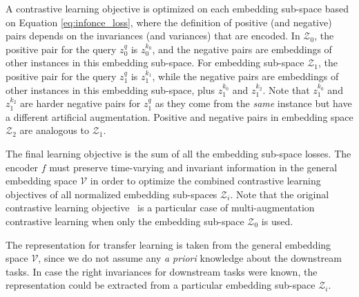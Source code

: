 \documentclass[10pt,twocolumn,letterpaper]{article}
\begin{document}
A contrastive learning objective is optimized on each embedding sub-space based on Equation \ref{eq:infonce_loss}, where the definition of positive (and negative) pairs depends on the invariances (and variances) that are encoded. In $\mathcal{Z}_0$, the positive pair for the query $z_0^q$ is $z_0^{k_0}$, and the negative pairs are embeddings of other instances in this embedding sub-space. For embedding sub-space $\mathcal{Z}_1$, the positive pair for the query $z_1^q$ is $z_1^{k_1}$, while the negative pairs are embeddings of other instances in this embedding sub-space, plus $z_1^{k_0}$ and $z_1^{k_2}$. Note that $z_1^{k_0}$ and $z_1^{k_2}$ are harder negative pairs for $z_1^q$ as they come from the \textit{same} instance but have a different artificial augmentation. Positive and negative pairs in embedding space $\mathcal{Z}_2$ are analogous to $\mathcal{Z}_1$. 

The final learning objective is the sum of all the embedding sub-space losses. The encoder $f$ must preserve time-varying and invariant information in the general embedding space $\mathcal{V}$ in order to optimize the combined contrastive learning objectives of all normalized embedding sub-spaces $\mathcal{Z}_i$. Note that the original contrastive learning objective~\cite{oord2018representation} is a particular case of multi-augmentation contrastive learning when only the embedding sub-space $\mathcal{Z}_0$ is used.

The representation for transfer learning is taken from the general embedding space $\mathcal{V}$, since we do not assume any \textit{a priori} knowledge about the downstream tasks. In case the right invariances for downstream tasks were known, the representation could be extracted from a particular embedding sub-space $\mathcal{Z}_i$.
\end{document}
